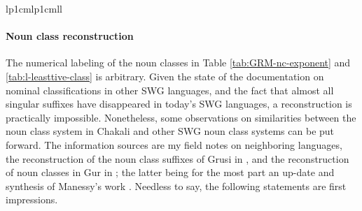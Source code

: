 \begin{exe}
\begin{exe}
\begin{exe}
{\begin{exe}
\begin{exe}
\begin{exe}
\begin{exe}
\begin{table}[htb!]
\begin{Itabular}{lp{1cm}lp{1cm}ll}
  
 \lspbottomrule
   \end{Itabular}
 \end{table}





\paragraph{Noun class reconstruction}
\label{sec:GRM-noun-class-recons}
The numerical labeling of the noun classes in Table \ref{tab:GRM-nc-exponent}
and \ref{tab:l-leasttive-class} is arbitrary. Given  the state of the
documentation on nominal classifications in other SWG languages, and the fact
that  almost all singular suffixes
have disappeared in today's SWG languages, a reconstruction  is practically
impossible. Nonetheless,  some 
observations  on similarities between the noun class
system in Chakali and other SWG noun class systems can be put forward. The
information sources are my field notes on neighboring languages, the
reconstruction of the
noun class suffixes of Grusi in \citet{Mane69a, Mane69b},  and the 
reconstruction
of noun classes in Gur in \citet{Mieh07}; the latter being for the most part an
up-date and synthesis of Manessy's work \citep{Mane69a, Mane69b, Mane75, Mane79,
Mane82, Mane99}. Needless to say, the following statements are first
impressions.



\end{exe}
\end{exe}
\end{exe}
\end{exe}}
\end{exe}
\end{exe}
\end{exe}
